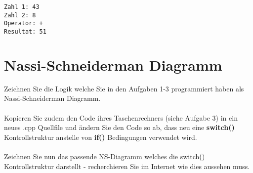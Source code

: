 \documentclass[a4paper,10pt]{article}
\begin{document}
\verb|Zahl 1: 43|\\
\verb|Zahl 2: 8|\\
\verb|Operator: +|\\
\verb|Resultat: 51|

\section{Nassi-Schneiderman Diagramm}
Zeichnen Sie die Logik welche Sie in den Aufgaben 1-3 programmiert haben als Nassi-Schneiderman Diagramm. \\ 
\\
Kopieren Sie zudem den Code ihres Taschenrechners (siehe Aufgabe 3) in ein neues .cpp Quellfile und \"andern Sie den Code so ab, dass neu eine \textbf{switch()} Kontrollstruktur anstelle von \textbf{if()} Bedingungen verwendet wird. \\
\\
Zeichnen Sie nun das passende NS-Diagramm welches die switch() Kontrollstruktur darstellt - recherchieren Sie im Internet wie dies aussehen muss.
\end{document}
